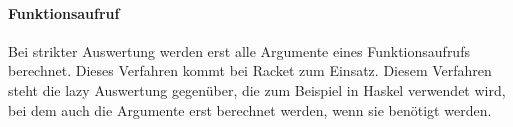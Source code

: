 \documentclass[../main.tex]{subfiles}
\begin{document}
        \paragraph{Funktionsaufruf}
            Bei strikter Auswertung werden erst alle Argumente eines Funktionsaufrufs berechnet. Dieses Verfahren kommt bei Racket zum Einsatz. Diesem Verfahren steht die lazy Auswertung gegenüber, die zum Beispiel in Haskel verwendet wird, bei dem auch die Argumente erst berechnet werden, wenn sie benötigt werden.         
\end{document}
